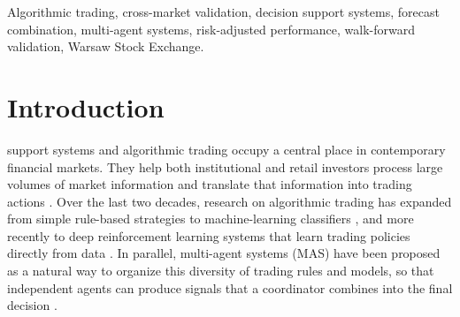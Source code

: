 \documentclass{ieeeaccess}
\begin{document}
\begin{keywords}
Algorithmic trading, cross-market validation, decision support systems, forecast combination, multi-agent systems, risk-adjusted performance, walk-forward validation, Warsaw Stock Exchange.
\end{keywords}

\titlepgskip=-21pt

\maketitle

\section{Introduction}
\label{sec:introduction}
 support systems and algorithmic trading occupy a central place in contemporary financial markets. They help both institutional and retail investors process large volumes of market information and translate that information into trading actions \cite{hendershott_does_2011}. Over the last two decades, research on algorithmic trading has expanded from simple rule-based strategies \cite{brock1992} to machine-learning classifiers \cite{gerlein2016,fischerkrauss2018}, and more recently to deep reinforcement learning systems that learn trading policies directly from data \cite{huang2022,shavandi2022,hambly2023}. In parallel, multi-agent systems (MAS) have been proposed as a natural way to organize this diversity of trading rules and models, so that independent agents can produce signals that a coordinator combines into the final decision \cite{luo2002,korczak2013,hernes2016,hernes2024}.
\end{document}
